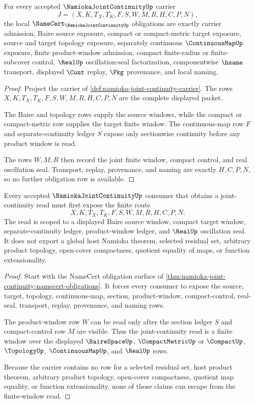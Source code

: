 \begin{theorem}
\label{thm:namioka-joint-continuity-namecert-obligations}
For every accepted $\NamiokaJointContinuityUp$ carrier
$$
J=(X,K,T_X,T_K,F,S,W,M,R,H,C,P,N),
$$
the local $\NameCert_{\NamiokaJointContinuityUp}$ obligations are exactly carrier admission, Baire source exposure, compact or compact-metric target exposure, source and target topology exposure, separately continuous $\ContinuousMapUp$ exposure, finite product-window admission, compact finite-radius or finite-subcover control, $\RealUp$ oscillation-seal factorization, componentwise $\hsame$ transport, displayed $\Cont$ replay, $\Pkg$ provenance, and local naming.
\end{theorem}
\begin{proof}
Project the carrier of \autoref{def:namioka-joint-continuity-carrier}. The rows $X,K,T_X,T_K,F,S,W,M,R,H,C,P,N$ are the complete displayed packet.

The Baire and topology rows supply the source windows, while the compact or compact-metric row supplies the target finite window. The continuous-map row $F$ and separate-continuity ledger $S$ expose only sectionwise continuity before any product window is read.

The rows $W,M,R$ then record the joint finite window, compact control, and real oscillation seal. Transport, replay, provenance, and naming are exactly $H,C,P,N$, so no further obligation row is available.
\end{proof}

\begin{theorem}
\label{thm:namioka-joint-continuity-finite-window-scope}
Every accepted $\NamiokaJointContinuityUp$ consumer that obtains a joint-continuity read must first expose the finite route
$$
X,K,T_X,T_K,F,S,W,M,R,H,C,P,N.
$$
The read is scoped to a displayed Baire source window, compact target window, separate-continuity ledger, product-window ledger, and $\RealUp$ oscillation seal. It does not export a global host Namioka theorem, selected residual set, arbitrary product topology, open-cover compactness, quotient equality of maps, or function extensionality.
\end{theorem}
\begin{proof}
Start with the NameCert obligation surface of \autoref{thm:namioka-joint-continuity-namecert-obligations}. It forces every consumer to expose the source, target, topology, continuous-map, section, product-window, compact-control, real-seal, transport, replay, provenance, and naming rows.

The product-window row $W$ can be read only after the section ledger $S$ and compact-control row $M$ are visible. Thus the joint-continuity read is a finite window over the displayed $\BaireSpaceUp$, $\CompactMetricUp$ or $\CompactUp$, $\TopologyUp$, $\ContinuousMapUp$, and $\RealUp$ rows.

Because the carrier contains no row for a selected residual set, host product theorem, arbitrary product topology, open-cover compactness, quotient map equality, or function extensionality, none of those claims can escape from the finite-window read.
\end{proof}

